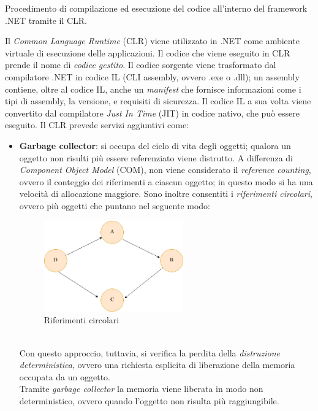 \begin{problem}{1.3}
Procedimento di compilazione ed esecuzione del codice all'interno del framework .NET tramite il CLR.
\end{problem}
\begin{solution}
Il \textit{Common Language Runtime} (CLR) viene utilizzato in .NET come ambiente virtuale di esecuzione delle applicazioni.
Il codice che viene eseguito in CLR prende il nome di \textit{codice gestito}.
\newline
Il codice sorgente viene trasformato dal compilatore .NET in codice IL (CLI assembly, ovvero .exe o .dll); un assembly contiene, oltre al codice IL, anche un \textit{manifest} che fornisce informazioni come i tipi di assembly, la versione, e requisiti di sicurezza.
Il codice IL a sua volta viene convertito dal compilatore \textit{Just In Time} (JIT) in codice nativo, che può essere eseguito.
\newline
Il CLR prevede servizi aggiuntivi come:
\begin{itemize}
	\item \textbf{Garbage collector}: si occupa del ciclo di vita degli oggetti; qualora un oggetto non risulti più essere referenziato viene distrutto.
	\newline
	A differenza di \textit{Component Object Model} (COM), non viene considerato il \textit{reference counting}, ovvero il conteggio dei riferimenti a ciascun oggetto; in questo modo si ha una velocità di allocazione maggiore.
	\newline
	Sono inoltre consentiti i \textit{riferimenti circolari}, ovvero più oggetti che puntano nel seguente modo:
	\begin{figure}[h]
	\centering
	\includegraphics[width=6cm]{./immagini/riferimentiCircolari.jpg}
	\caption{Riferimenti circolari}
\end{figure}\\
	Con questo approccio, tuttavia, si verifica la perdita della \textit{distruzione deterministica}, ovvero una richiesta esplicita di liberazione della memoria occupata da un oggetto.
	\\Tramite \textit{garbage collector} la memoria viene liberata in modo non deterministico, ovvero quando l'oggetto non risulta più raggiungibile.

\end{itemize}
\end{solution}
